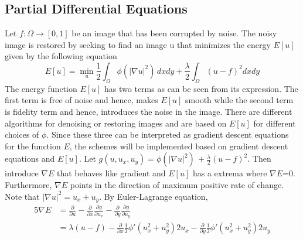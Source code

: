 \documentclass[12pt]{report}
\begin{document}
\begin{tableofcontents}
		\chapter{Partial Differential Equations}
Let $f:\Omega \to [0,1]$ be an image that has been corrupted by noise. The noisy image is restored by seeking to find an image u that minimizes the energy $E[u]$ given by the following equation
\newline
			\begin{equation}
E\left[u\right] = \displaystyle\min_{u}\frac{1}{2} \int_\Omega \phi(|\nabla u|^2) \, dx dy + \frac{\lambda}{2}\int_{\Omega}(u-f)^2 dxdy
			\end{equation}
The energy function $E[u]$ has two terms as can be seen from its expression. The first term is free of noise and hence, makes $E[u]$ smooth while the second term is fidelity term and hence, introduces the noise in the image. There are different algorithms for denoising or restoring images and are based on $E[u]$ for different choices of $\phi$. Since these three can be interpreted as gradient descent equations for the function $E$, the schemes will be implemented based on gradient descent equations and $E[u]$.
\newline
\newline
Let $g(u, u_{x}, u_{y})=\phi(|\nabla u|^2) \, + \frac{\lambda}{2}(u-f)^2$. Then introduce  $\nabla E$ that behaves like gradient and $E[u]$ has a extrema where $\nabla E$=0. Furthermore, $\nabla E$ points in the direction of maximum positive rate of change. Note that $|\nabla u|^2=u_{x}+u_{y}$. By Euler-Lagrange equation,
			\begin{alignat*}{5}
\nabla E &= \frac{\partial}{\partial u} - \frac{\partial}{\partial x}\frac{\partial g}{\partial u_{x}}
			- \frac{\partial}{\partial y}\frac{\partial g}{\partial u_{y}} \\
	&= \lambda(u-f) - \frac{\partial}{\partial x}\frac{1}{2}\phi'(u_{x}^2+u_{y}^2)2u_{x}
    	- \frac{\partial}{\partial y}\frac{1}{2}\phi'(u_{x}^2+u_{y}^2)2u_{y} \\

\end{alignat*}
\end{tableofcontents}
\end{document}

